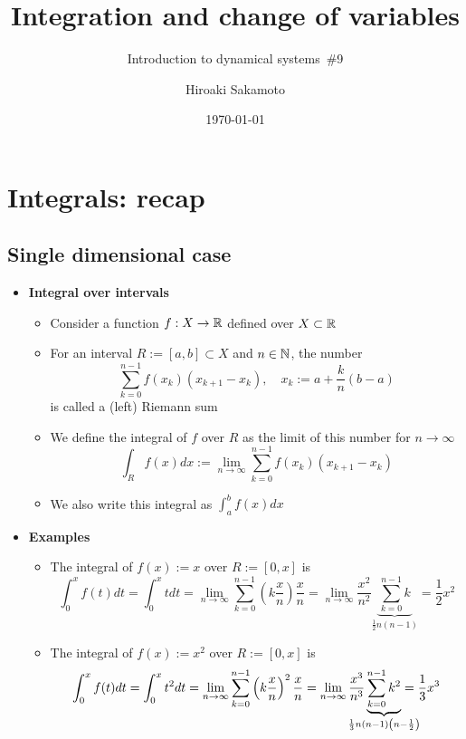 \documentclass[12pt,a4paper]{article}
\title{Integration and change of variables}
\subtitle{Introduction to dynamical systems~\#9}
\author{Hiroaki Sakamoto}
\date{\today}
\begin{document}
\maketitle
\tableofcontents

\section{Integrals: recap}

\subsection{Single dimensional case}

\begin{itemize}

\item \textbf{Integral over intervals}
  \begin{itemize}
  \item Consider a function $f:X \to \mathbb{R}$ defined over $X\subset \mathbb{R}$ 
  \item For an interval $R:=[a, b]\subset X$ and $n\in \mathbb{N}$,
    the number
    \begin{equation}\nonumber%
      \sum_{k=0}^{n-1}f(x_{k})(x_{k+1}-x_{k}),
      \quad x_{k}:= a + \frac{k}{n}(b-a)
    \end{equation}
    is called a (left) Riemann sum
  \item We define the integral of $f$ over $R$ as the limit of this number for $n\to \infty$
    \begin{equation}\nonumber%
      \int_{R}f(x)dx := \lim_{n\to \infty}\sum_{k=0}^{n-1}f(x_{k})(x_{k+1}-x_{k})
    \end{equation}
  \item We also write this integral as $\int_{a}^{b}f(x)dx$
  \end{itemize}

\item \textbf{Examples}
  \begin{itemize}
  \item The integral of $f(x):=x$ over $R:=[0,x]$ is
    \begin{equation}\nonumber
      \int_{0}^{x}f(t)dt
      =
      \int_{0}^{x}tdt
      =
      \lim_{n\to\infty}\sum_{k=0}^{n-1}\left(k\frac{x}{n}\right)\frac{x}{n}
      =
      \lim_{n\to\infty}\frac{x^{2}}{n^{2}}\underbrace{\sum_{k=0}^{n-1}k}_{\frac{1}{2}n(n-1)}
      =
      \frac{1}{2}x^{2}
    \end{equation}
  \item The integral of $f(x) := x^{2}$ over $R:=[0,x]$ is
    \begin{equation}\nonumber
      \int_{0}^{x}f(t)dt
      =
      \int_{0}^{x}t^{2}dt
      =
      \lim_{n\to\infty}\sum_{k=0}^{n-1}\left(k\frac{x}{n}\right)^{2}\frac{x}{n}
      =
      \lim_{n\to\infty}\frac{x^{3}}{n^{3}}\hspace{-15pt}\underbrace{\sum_{k=0}^{n-1}k^{2}}_{\frac{1}{3}n(n-1)\left(n-\frac{1}{2}\right)}\hspace{-15pt}
      =
      \frac{1}{3}x^{3}
    \end{equation}
  \end{itemize}


\end{itemize}
\end{document}
